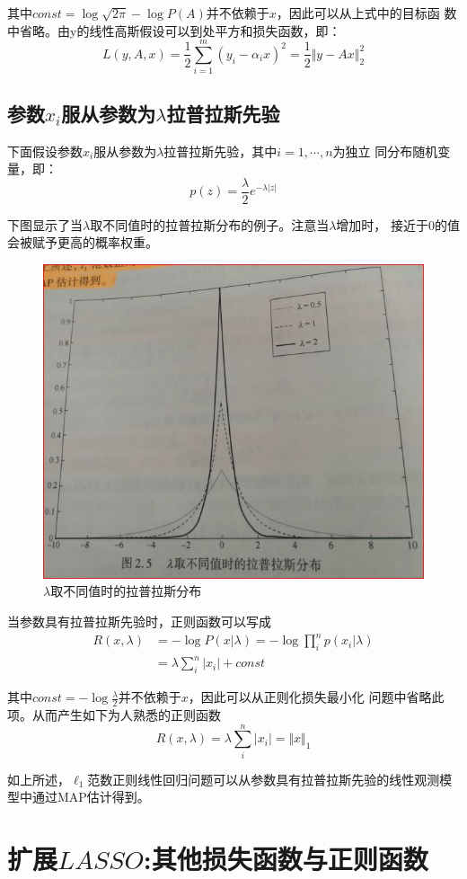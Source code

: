 其中$const=\log \sqrt{2\pi}-\log P(A)$并不依赖于$ x $，因此可以从上式中的目标函
数中省略。由y的线性高斯假设可以到处平方和损失函数，即：
\begin{equation*}\label{key}
L(y,A,x)  = \dfrac{1}{2}\sum_{i=1}^{m}(y_i-\alpha_i x)^2 = \dfrac{1}{2}\Vert y-Ax\Vert_2^2
\end{equation*}


\subsection{参数$ x_i $服从参数为$ \lambda $拉普拉斯先验}

下面假设参数$ x_i $服从参数为$ \lambda $拉普拉斯先验，其中$ i=1,\cdots,n $为独立
同分布随机变量，即：
\begin{equation}\label{key}
p(z) = \dfrac{\lambda}{2}e^{-\lambda|z|}
\end{equation}

下图显示了当$ \lambda $取不同值时的拉普拉斯分布的例子。注意当$ \lambda $增加时，
接近于0的值会被赋予更高的概率权重。
\begin{figure}
	\centering
	\includegraphics[width=0.7\linewidth]{Img/chap_srt01_problem/lap_lambda}
	\caption{$ \lambda $取不同值时的拉普拉斯分布}
	\label{fig:laplambda}
\end{figure}


当参数具有拉普拉斯先验时，正则函数可以写成
\begin{equation}\label{key}
\begin{split}
R(x,\lambda) &= -\log P(x|\lambda) = -\log \prod_i^{n}p(x_i|\lambda) \\
             &= \lambda\sum_i^n |x_i| +const
\end{split}
\end{equation}

其中$const=-\log\frac{\lambda}{2} $并不依赖于$ x $，因此可以从正则化损失最小化
问题中省略此项。从而产生如下为人熟悉的正则函数
\begin{equation*}\label{key}
R(x,\lambda) = \lambda\sum_i^n |x_i| = \Vert x\Vert_1
\end{equation*}


如上所述，$ \ell_1 $范数正则线性回归问题可以从参数具有拉普拉斯先验的线性观测模型中通过MAP估计得到。


\section{扩展$ LASSO $:其他损失函数与正则函数}












